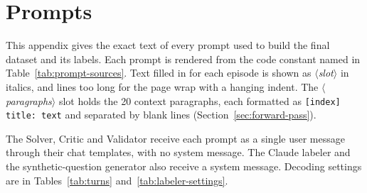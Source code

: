 \chapter{Prompts}
\label{app:prompts}


\newenvironment{promptbox}{\par\smallskip\noindent\rule{\linewidth}{0.4pt}\par
    \begingroup\footnotesize\ttfamily\raggedright\frenchspacing
    \setlength{\parindent}{0pt}\setlength{\parskip}{0pt}\leftskip=1em
    \everypar{\hangindent=2em\hangafter=1}}
    {\par\endgroup\noindent\rule{\linewidth}{0.4pt}\par\smallskip}
\newcommand{\promptslot}[1]{{\rmfamily\itshape$\langle$#1$\rangle$}}
\newcommand{\promptblank}{\vspace{0.6\baselineskip}}

This appendix gives the exact text of every prompt used to build the final
dataset and its labels. Each prompt is rendered from the code constant named
in Table~\ref{tab:prompt-sources}. Text filled in for each episode is shown as
\promptslot{slot} in italics, and lines too long for the page wrap with a
hanging indent. The \promptslot{paragraphs} slot holds the 20 context
paragraphs, each formatted as \texttt{[index] title: text} and separated by
blank lines (Section~\ref{sec:forward-pass}).

The Solver, Critic and Validator receive each prompt as a single user message
through their chat templates, with no system message. The Claude labeler and
the synthetic-question generator also receive a system message. Decoding
settings are in Tables~\ref{tab:turns} and~\ref{tab:labeler-settings}.

